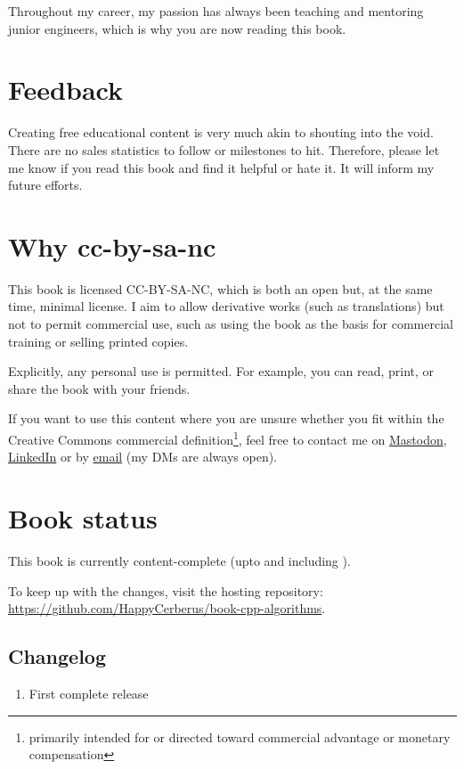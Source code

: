 Throughout my career, my passion has always been teaching and mentoring junior engineers, which is why you are now reading this book.

\section*{Feedback}

Creating free educational content is very much akin to shouting into the void. There are no sales statistics to follow or milestones to hit. Therefore, please let me know if you read this book and find it helpful or hate it. It will inform my future efforts.

\section*{Why cc-by-sa-nc}

This book is licensed CC-BY-SA-NC, which is both an open but, at the same time, minimal license. I aim to allow derivative works (such as translations) but not to permit commercial use, such as using the book as the basis for commercial training or selling printed copies.

Explicitly, any personal use is permitted. For example, you can read, print, or share the book with your friends.

If you want to use this content where you are unsure whether you fit within the Creative Commons commercial definition\footnote{primarily intended for or directed toward commercial advantage or monetary compensation}, feel free to contact me on \href{https://hachyderm.io/@simontoth}{Mastodon}, \href{https://cz.linkedin.com/in/simontoth}{LinkedIn} or by \href{mailto:business@simontoth.eu}{email} (my DMs are always open).

\section*{Book status}

This book is currently content-complete (upto and including ).

To keep up with the changes, visit the hosting repository: \url{https://github.com/HappyCerberus/book-cpp-algorithms}.

\subsection*{Changelog}

\begin{enumerate}
    \item[1.0] First complete release
\end{enumerate}